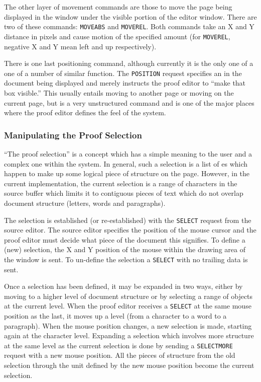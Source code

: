 The other layer of movement commands are those to move the page being
displayed in the window under the visible portion of the editor window.
There are two of these commands: {\tt MOVEABS} and {\tt MOVEREL}.
Both commands take an X and Y distance in pixels and cause motion
of the specified amount (for {\tt MOVEREL}, negative X and Y
mean left and up respectively).

There is one last positioning command, although currently it is the only
one of a one of a number of similar function.  The {\tt POSITION} request
specifies an {\nbox} in the document being displayed and merely instructs
the proof editor to ``make that box visible.''  This usually entails
moving to another page or moving on the current page, but is a very
unstructured command and is one of the major places where the proof
editor defines the feel of the system.

\subsubsection{Manipulating the Proof Selection}

``The proof selection'' is a concept which has a simple meaning to
the user and a complex one within the system.  In general, such a
selection is a list of \nbox es which happen to make up some logical
piece of structure on the page.  However, in the current implementation,
the current selection is a range of characters in the source buffer
which limits it to contiguous pieces of text which do not overlap
document structure (letters, words and paragraphs).

The selection is established (or re-established) with the {\tt SELECT}
request from the source editor.  The source editor specifies the
position of the mouse cursor and the proof editor must decide what
piece of the document this signifies.  To define a (new) selection,
the X and Y position of the mouse within the drawing area of the
window is sent.  To un-define the selection a {\tt SELECT} with no
trailing data is sent.

Once a selection has been defined, it may be expanded in two ways,
either by moving to a higher level of document structure or by
selecting a range of objects at the current level.  When the proof
editor receives a {\tt SELECT} at the same mouse position as the last,
it moves up a level (from a character to a word to a paragraph).  When
the mouse position changes, a new selection is made, starting again at
the character level.  Expanding a selection which involves more
structure at the same level as the current selection is done by
sending a {\tt SELECTMORE} request with a new mouse position.  All the
pieces of structure from the old selection through the unit defined by
the new mouse position become the current selection.

